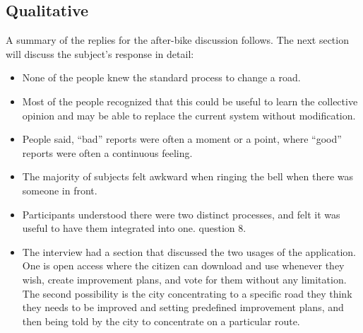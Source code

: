 \subsection{Qualitative}
A summary of the replies for the after-bike discussion follows. The next section will discuss the subject's response in detail:
\begin{itemize}
\item None of the people knew the standard process to change a road.
\item Most of the people recognized that this could be useful to learn the collective opinion and may be able to replace the current system without modification.
\item People said, ``bad'' reports were often a moment or a point, where ``good'' reports were often a continuous feeling. 
\item The majority of subjects felt awkward when ringing the bell when there was someone in front.
\item Participants understood there were two distinct processes, and felt it was useful to have them integrated into one.  question 8. 
\item The interview had a section that discussed the two usages of the application. One is open access where the citizen can download and use whenever they wish, create improvement plans, and vote for them without any limitation. The second possibility is the city concentrating to a specific road they think they needs to be improved and setting predefined improvement plans, and then being told by the city to concentrate on a particular route. 
\end{itemize}

